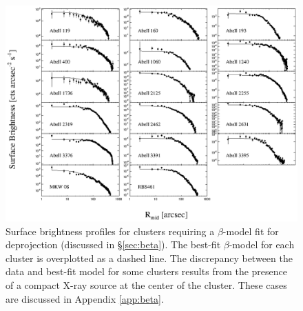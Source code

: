 \clearpage
\begin{figure}[htp]
  \begin{center}
    \begin{minipage}[htp]{0.9\linewidth}
      \includegraphics*[width=\textwidth, trim=15mm 10mm 10mm 10mm, clip]{beta.eps}
      \caption{Surface brightness profiles for clusters requiring a
        $\beta$-model fit for deprojection (discussed in
        \S\ref{sec:beta}). The best-fit $\beta$-model for each cluster
        is overplotted as a dashed line. The discrepancy between the
        data and best-fit model for some clusters results from the
        presence of a compact X-ray source at the center of the
        cluster. These cases are discussed in Appendix
        \ref{app:beta}.}
      \label{fig:betamods}
    \end{minipage}
  \end{center}
\end{figure}
\clearpage
